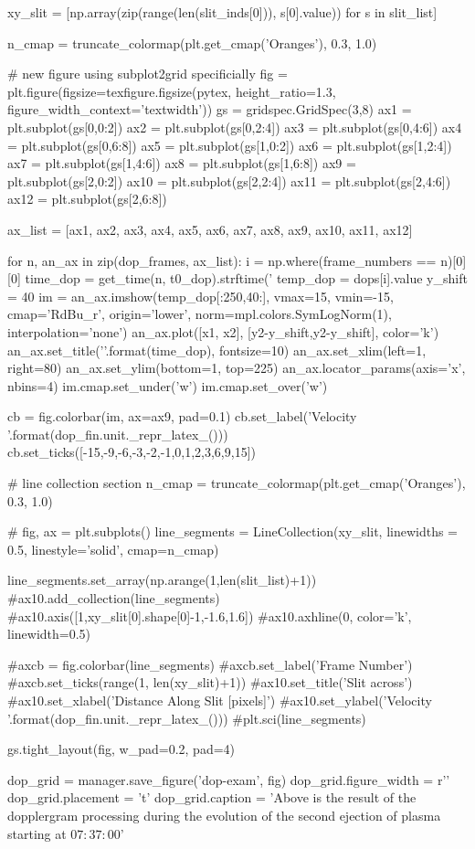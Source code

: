 \documentclass{emulateapj}
\begin{document}
\begin{pycode}[DOPPLER]
xy_slit = [np.array(zip(range(len(slit_inds[0])), s[0].value)) for s in slit_list]


n_cmap = truncate_colormap(plt.get_cmap('Oranges'), 0.3, 1.0)


# new figure using subplot2grid specificially
fig = plt.figure(figsize=texfigure.figsize(pytex, height_ratio=1.3, figure_width_context='textwidth'))
gs = gridspec.GridSpec(3,8)
ax1 = plt.subplot(gs[0,0:2])
ax2 = plt.subplot(gs[0,2:4])
ax3 = plt.subplot(gs[0,4:6])
ax4 = plt.subplot(gs[0,6:8])
ax5 = plt.subplot(gs[1,0:2])
ax6 = plt.subplot(gs[1,2:4])
ax7 = plt.subplot(gs[1,4:6])
ax8 = plt.subplot(gs[1,6:8])
ax9 = plt.subplot(gs[2,0:2])
ax10 = plt.subplot(gs[2,2:4])
ax11 = plt.subplot(gs[2,4:6])
ax12 = plt.subplot(gs[2,6:8])
 
ax_list = [ax1, ax2, ax3, ax4, ax5, ax6,
           ax7, ax8, ax9, ax10, ax11, ax12]

for n, an_ax in zip(dop_frames, ax_list):
    i = np.where(frame_numbers == n)[0][0]
    time_dop = get_time(n, t0_dop).strftime('%
    temp_dop = dops[i].value
    y_shift = 40
    im = an_ax.imshow(temp_dop[:250,40:], vmax=15, vmin=-15,
                      cmap='RdBu_r', origin='lower',
                      norm=mpl.colors.SymLogNorm(1),
                      interpolation='none')
    an_ax.plot([x1, x2], [y2-y_shift,y2-y_shift], color='k')
    an_ax.set_title('{}'.format(time_dop), fontsize=10)
    an_ax.set_xlim(left=1, right=80)
    an_ax.set_ylim(bottom=1, top=225)
    an_ax.locator_params(axis='x', nbins=4)
    im.cmap.set_under('w')
    im.cmap.set_over('w')

cb = fig.colorbar(im, ax=ax9, pad=0.1)
cb.set_label('Velocity {}'.format(dop_fin.unit._repr_latex_()))
cb.set_ticks([-15,-9,-6,-3,-2,-1,0,1,2,3,6,9,15])

# line collection section
n_cmap = truncate_colormap(plt.get_cmap('Oranges'), 0.3, 1.0)

# fig, ax = plt.subplots()
line_segments = LineCollection(xy_slit,
                               linewidths = 0.5,
                               linestyle='solid',
                               cmap=n_cmap)

line_segments.set_array(np.arange(1,len(slit_list)+1))
#ax10.add_collection(line_segments)
#ax10.axis([1,xy_slit[0].shape[0]-1,-1.6,1.6])
#ax10.axhline(0, color='k', linewidth=0.5)

#axcb = fig.colorbar(line_segments)
#axcb.set_label('Frame Number')
#axcb.set_ticks(range(1, len(xy_slit)+1))
#ax10.set_title('Slit across')
#ax10.set_xlabel('Distance Along Slit [pixels]')
#ax10.set_ylabel('Velocity {}'.format(dop_fin.unit._repr_latex_()))
#plt.sci(line_segments)

gs.tight_layout(fig, w_pad=0.2, pad=4)

dop_grid = manager.save_figure('dop-exam', fig)
dop_grid.figure_width = r'\textwidth'
dop_grid.placement = 't'
dop_grid.caption = 'Above is the result of the dopplergram processing during the evolution of the second ejection of plasma starting at $07:37:00$'


\end{pycode}
\end{document}

